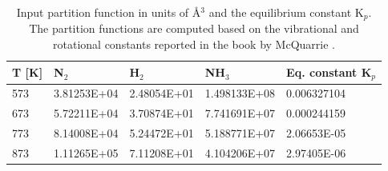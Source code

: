 \begin{table}[H]
\centering
\begin{tabular}{l|l|l|l|l}
T [K] &   N$_2$ & H$_2$ & NH$_3$ & Eq. constant K$_p$\\
\hline
573 & 3.81253E+04 & 2.48054E+01 & 1.498133E+08 & 0.006327104\\
673 & 5.72211E+04 & 3.70874E+01 & 7.741691E+07 & 0.000244159\\
773 & 8.14008E+04 & 5.24472E+01 & 5.188771E+07 & 2.06653E-05\\
873 & 1.11265E+05 & 7.11208E+01 & 4.104206E+07 & 2.97405E-06\\
\hline
\end{tabular}
\caption{Input partition function in units of \AA$^3$ and the equilibrium constant K$_p$.
The partition functions are computed based on the vibrational and rotational constants reported in the book by McQuarrie \cite{McQuarrie2000}.}
\label{Tutorial reaction-input}
\end{table}



\begin{center}
\end{center}



